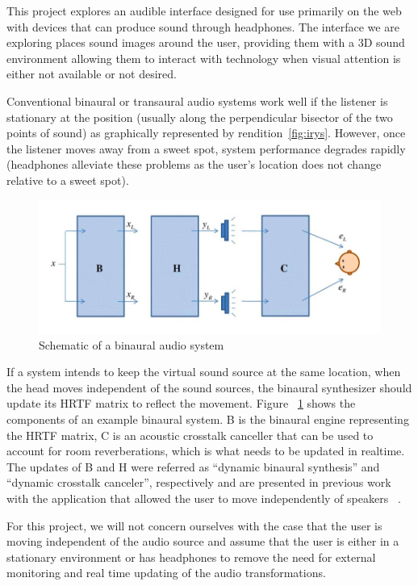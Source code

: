 This project explores an audible interface designed for use primarily on the
web with devices that can produce sound through headphones. The interface we 
are exploring places sound images around the user, providing them with a 3D
sound environment allowing them to interact with technology when visual 
attention is either not available or not desired.

Conventional binaural or transaural audio systems work well if the listener is
stationary at the position (usually along the perpendicular bisector of the two
points of sound) as graphically represented by rendition~\ref{fig:irys}. However,
once the listener moves away from a sweet spot, system performance degrades
rapidly (headphones alleviate these problems as the user's location does not
change relative to a sweet spot).

\begin{figure}[h]
  \centering
  \includegraphics[width=1\textwidth]{images/binaural_diagram.jpg}
  \caption{Schematic of a binaural audio system}
  \label{fig:schematic}
\end{figure}

If a system intends to keep the virtual sound source at the same location, when
the head moves independent of the sound sources, the binaural synthesizer should
update its HRTF matrix to reflect the movement. Figure ~\ref{fig:schematic}
shows the components of an example binaural system.  B is the binaural engine
representing the HRTF matrix, C is an acoustic crosstalk canceller that can be used to
account for room  reverberations, which is what needs to be updated in realtime.
The updates of B and H were referred as “dynamic binaural synthesis” and
“dynamic crosstalk canceler”, respectively and are presented in previous work 
with the application that allowed the user to move independently of speakers
~\cite{lentz2006dynamic}.

For this project, we will not concern ourselves with the case that the user is
moving independent of the audio source and assume that the user is either in a
stationary environment or has headphones to remove the need for external
monitoring and real time updating of the audio transformations.

